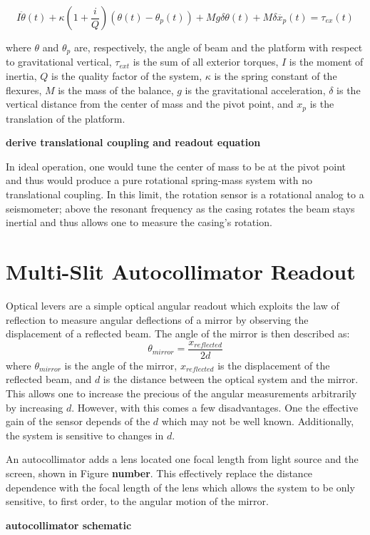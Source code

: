 \documentclass [12pt, proquest]{uwthesis}[2019]
\begin{document}
\[I \ddot{\theta}(t)+\kappa (1+ \frac{i}{Q})(\theta(t)-\theta_p(t))+M g \delta \theta(t) +M \delta \ddot{x_p}(t)=\tau_{ex}(t)\]

where $\theta$ and $\theta_p$ are, respectively, the angle of beam and the platform with respect to gravitational vertical, $\tau_{ext}$ is the sum of all exterior torques, $I$ is the moment of inertia, $Q$ is the quality factor of the system, $\kappa$ is the spring constant of the flexures, $M$ is the mass of the balance, $g$ is the gravitational acceleration, $\delta$ is the vertical distance from the center of mass and the pivot point, and $x_p$ is the translation of the platform.

\textbf{derive translational coupling and readout equation}

In ideal operation, one would tune the center of mass to be at the pivot point and thus would produce a pure rotational spring-mass system with no translational coupling. In this limit, the rotation sensor is a rotational analog to a seismometer; above the resonant frequency as the casing rotates the beam stays inertial and thus allows one to measure the casing's rotation.

\section{Multi-Slit Autocollimator Readout}

\quad Optical levers are a simple optical angular readout which exploits the law of reflection to measure angular deflections of a mirror by observing the displacement of a reflected beam. The angle of the mirror is then described as:
\[\theta_{mirror}=\frac{x_{reflected}}{2d}\]
where $\theta_{mirror}$ is the angle of the mirror, $x_{reflected}$ is the displacement of the reflected beam, and $d$ is the distance between the optical system and the mirror. This allows one to increase the precious of the angular measurements arbitrarily by increasing $d$. However, with this comes a few disadvantages. One the effective gain of the sensor depends of the $d$ which may not be well known. Additionally, the system is sensitive to changes in $d$. 

An autocollimator adds a lens located one focal length from light source and the screen, shown in Figure \textbf{number}. This effectively replace the distance dependence with the focal length of the lens which allows the system to be only sensitive, to first order, to the angular motion of the mirror.

\textbf{autocollimator schematic}
\end{document}
